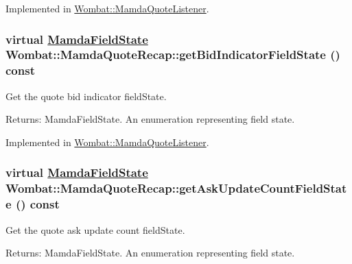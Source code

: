 Implemented in \hyperlink{classWombat_1_1MamdaQuoteListener_20c6b7c6cf1359fdd184a7d83bc93521}{Wombat::Mamda\-Quote\-Listener}.\hypertarget{classWombat_1_1MamdaQuoteRecap_ff522048df5c7fe409315f4d694ddaca}{
\subsubsection[getBidIndicatorFieldState]{\setlength{\rightskip}{0pt plus 5cm}virtual \hyperlink{namespaceWombat_93aac974f2ab713554fd12a1fa3b7d2a}{Mamda\-Field\-State} Wombat::Mamda\-Quote\-Recap::get\-Bid\-Indicator\-Field\-State () const}}
\label{classWombat_1_1MamdaQuoteRecap_ff522048df5c7fe409315f4d694ddaca}


Get the quote bid indicator field\-State. 

\begin{Desc}
\item[Returns:]Mamda\-Field\-State. An enumeration representing field state. \end{Desc}


Implemented in \hyperlink{classWombat_1_1MamdaQuoteListener_276b02c48efaa043e0d394569fe68a02}{Wombat::Mamda\-Quote\-Listener}.\hypertarget{classWombat_1_1MamdaQuoteRecap_c9fddc7ecb8d6b3cccd075b95917d2e2}{
\subsubsection[getAskUpdateCountFieldState]{\setlength{\rightskip}{0pt plus 5cm}virtual \hyperlink{namespaceWombat_93aac974f2ab713554fd12a1fa3b7d2a}{Mamda\-Field\-State} Wombat::Mamda\-Quote\-Recap::get\-Ask\-Update\-Count\-Field\-State () const}}
\label{classWombat_1_1MamdaQuoteRecap_c9fddc7ecb8d6b3cccd075b95917d2e2}


Get the quote ask update count field\-State. 

\begin{Desc}
\item[Returns:]Mamda\-Field\-State. An enumeration representing field state. \end{Desc}


